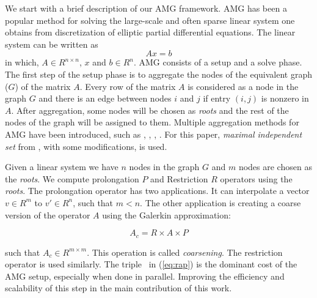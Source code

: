 We start with a brief description of our AMG framework. 
AMG has been a popular method for solving the large-scale and 
often sparse linear system one obtains from discretization of elliptic partial 
differential equations.  The linear system can be written as
\begin{equation}
 Ax = b
\end{equation}
\noindent in which, $A \in R^{n \times n}$, $x$ and $b \in R^{n}$.
AMG consists of a setup and a solve phase.
The first step of the setup phase is to aggregate the nodes of the equivalent 
graph ($G$) of the matrix $A$. Every row of the matrix $A$ is considered as a node
in the graph $G$ and there is an edge between nodes $i$ and $j$ if entry $(i,j)$ is nonzero in $A$.
After aggregation, %
some nodes will be chosen as \textit{roots} and the
rest of the nodes of the graph will be assigned to them.
Multiple aggregation methods for AMG have been introduced, such as
\cite{bell2012exposing}, \cite{notay2010aggregation},
\cite{Guillard98anaggregation}, %
\cite{DBLP:journals/siammax/Notay06}. %
For this paper, \textit{maximal independent set} from \cite{bell2012exposing}, with some modifications, is used.

Given a linear system we have $n$ 
nodes in the graph $G$ and $m$ nodes are chosen as the \textit{roots}.
We compute prolongation $P$ and Restriction $R$ operators using the \textit{roots}. 
The prolongation operator has two applications. It can interpolate a vector $v \in R^m$ to $v' \in R^n$, such that $m < n$.
The other application is creating a coarse version of the operator $A$ using the Galerkin approximation:

\begin{equation}
  \label{eq:rap}
 A_c = R \times A \times P
\end{equation}

\noindent such that $A_c \in R^{m \times m}$. This operation is called \textit{coarsening}.
The restriction operator is used similarly. The triple \mm\ in (\ref{eq:rap}) is the dominant cost of the AMG setup, especially when done in parallel. Improving the efficiency and scalability of this step in the main contribution of this work. 


